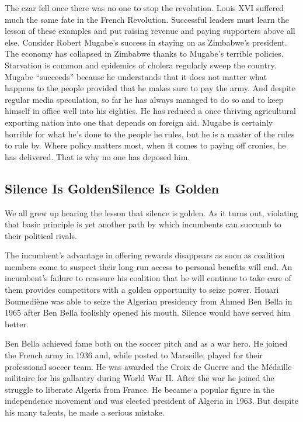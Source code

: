 \documentclass[10pt]{article}
\begin{document}
{\large The czar fell once there was no one to stop the revolution. Louis XVI
suffered much the same fate in the French Revolution. Successful leaders must
learn the lesson of these examples and put raising revenue and paying supporters
above all else. Consider Robert Mugabe's success in staying on as Zimbabwe's
president. The economy has collapsed in Zimbabwe thanks to Mugabe's terrible
policies. Starvation is common and epidemics of cholera regularly sweep the
country. Mugabe ``succeeds'' because he understands that it does not matter what
happens to the people provided that he makes sure to pay the army. And despite
regular media speculation, so far he has always managed to do so and to keep
himself in office well into his eighties. He has reduced a once thriving
agricultural exporting nation into one that depends on foreign aid. Mugabe is
certainly horrible for what he's done to the people he rules, but he is a master
of the rules to rule by. Where policy matters most, when it comes to paying off
cronies, he has delivered. That is why no one has deposed him.}

\subsection{Silence Is GoldenSilence Is Golden}

{\large We all grew up hearing the lesson that silence is golden. As it turns
out, violating that basic principle is yet another path by which incumbents can
succumb to their political rivals.}

{\large The incumbent's advantage in offering rewards disappears as soon as
coalition members come to suspect their long run access to personal benefits will
end. An incumbent's failure to reassure his coalition that he will continue to
take care of them provides competitors with a golden opportunity to seize power.
Houari Boumedi\`{e}ne was able to seize the Algerian presidency from Ahmed Ben
Bella in 1965 after Ben Bella foolishly opened his mouth. Silence would have
served him better.}

{\large Ben Bella achieved fame both on the soccer pitch and as a war hero. He
joined the French army in 1936 and, while posted to Marseille, played for their
professional soccer team. He was awarded the Croix de Guerre and the M\'{e}daille
militaire for his gallantry during World War II. After the war he joined the
struggle to liberate Algeria from France. He became a popular figure in the
independence movement and was elected president of Algeria in 1963. But despite
his many talents, he made a serious mistake.}
\end{document}
